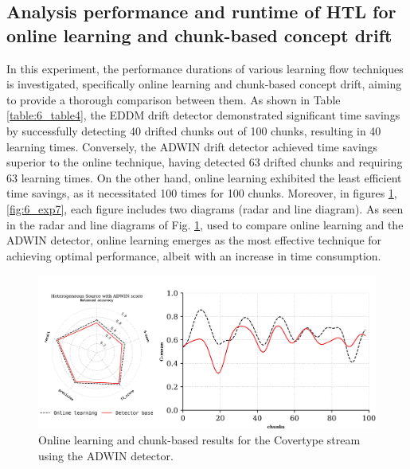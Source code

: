 \subsection{Analysis performance and runtime of HTL for online learning and chunk-based concept drift}

In this experiment, the performance durations of various learning flow techniques is investigated, specifically online learning and chunk-based concept drift, aiming to provide a thorough comparison between them. As shown in Table \ref{table:6_table4}, the EDDM drift detector demonstrated significant time savings by successfully detecting 40 drifted chunks out of 100 chunks, resulting in 40 learning times. Conversely, the ADWIN drift detector achieved time savings superior to the online technique, having detected 63 drifted chunks and requiring 63 learning times. On the other hand, online learning exhibited the least efficient time savings, as it necessitated 100 times for 100 chunks. Moreover, in figures \ref{fig:6_exp6},\ref{fig:6_exp7}, each figure includes two diagrams (radar and line diagram). As seen in the radar and line diagrams of Fig. \ref{fig:6_exp6}, used to compare online learning and the ADWIN detector, online learning emerges as the most effective technique for achieving optimal performance, albeit with an increase in time consumption.
\begin{figure}[H]
	\centering
	\includegraphics[width=1\linewidth]{6_transfer_learning/figures/exp4.png}
	\caption{Online learning and chunk-based results for the Covertype stream using the ADWIN detector.}
	\label{fig:6_exp6}
\end{figure}

